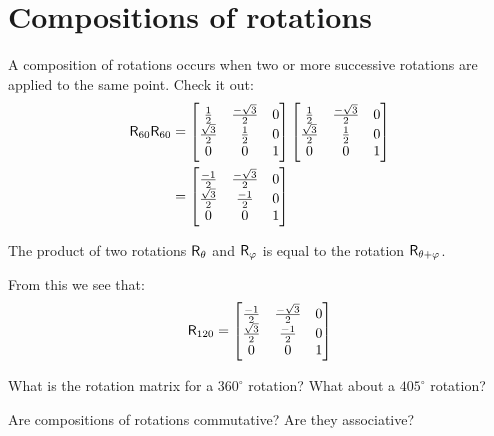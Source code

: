 \documentclass{ximera}
\begin{document}
\section{Compositions of rotations}


A composition of rotations occurs when two or more successive
rotations are applied to the same point. Check it out: 
\begin{align*}
\mathsf{R}_{60}\mathsf{R}_{60} &= \begin{bmatrix}
\frac{1}{2} & \frac{-\sqrt{3}}{2} & 0\\
\frac{\sqrt{3}}{2} & \frac{1}{2} & 0\\
0 & 0 & 1
\end{bmatrix}
\begin{bmatrix}
\frac{1}{2} & \frac{-\sqrt{3}}{2} & 0\\
\frac{\sqrt{3}}{2} & \frac{1}{2} & 0\\
0 & 0 & 1
\end{bmatrix}\\
&= \begin{bmatrix}
\frac{-1}{2} & \frac{-\sqrt{3}}{2} & 0\\
\frac{\sqrt{3}}{2} & \frac{-1}{2} & 0\\
0 & 0 & 1
\end{bmatrix}
\end{align*}

\begin{theorem}
The product of two rotations $\mathsf{R}_\theta$ and $\mathsf{R}_\varphi$ is
equal to the rotation $\mathsf{R}_{\theta+\varphi}$.
\end{theorem}

From this we see that:
\[
\mathsf{R}_{120} =
\begin{bmatrix}
\frac{-1}{2} & \frac{-\sqrt{3}}{2} & 0\\
\frac{\sqrt{3}}{2} & \frac{-1}{2} & 0\\
0 & 0 & 1
\end{bmatrix}
\]

\begin{question} What is the rotation matrix for a $360^\circ$ rotation? What about a $405^\circ$ rotation?
\end{question}


\begin{question}
Are compositions of rotations commutative?  Are they
associative?
\end{question}
\end{document}

